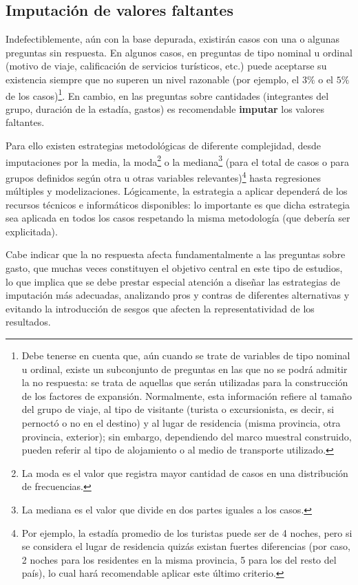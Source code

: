 \documentclass[
]{book}
\begin{document}
\hypertarget{imputaciuxf3n-de-valores-faltantes}{%
\subsection{Imputación de valores faltantes}\label{imputaciuxf3n-de-valores-faltantes}}

Indefectiblemente, aún con la base depurada, existirán casos con una o algunas preguntas sin respuesta. En algunos casos, en preguntas de tipo nominal u ordinal (motivo de viaje, calificación de servicios turísticos, etc.) puede aceptarse su existencia siempre que no superen un nivel razonable (por ejemplo, el \(3\%\) o el \(5\%\) de los casos)\footnote{Debe tenerse en cuenta que, aún cuando se trate de variables de tipo nominal u ordinal, existe un subconjunto de preguntas en las que no se podrá admitir la no respuesta: se trata de aquellas que serán utilizadas para la construcción de los factores de expansión. Normalmente, esta información refiere al tamaño del grupo de viaje, al tipo de visitante (turista o excursionista, es decir, si pernoctó o no en el destino) y al lugar de residencia (misma provincia, otra provincia, exterior); sin embargo, dependiendo del marco muestral construido, pueden referir al tipo de alojamiento o al medio de transporte utilizado.}. En cambio, en las preguntas sobre cantidades (integrantes del grupo, duración de la estadía, gastos) es recomendable \textbf{imputar} los valores faltantes.

Para ello existen estrategias metodológicas de diferente complejidad, desde imputaciones por la media, la moda\footnote{La moda es el valor que registra mayor cantidad de casos en una distribución de frecuencias.} o la mediana\footnote{La mediana es el valor que divide en dos partes iguales a los casos.} (para el total de casos o para grupos definidos según otra u otras variables relevantes)\footnote{Por ejemplo, la estadía promedio de los turistas puede ser de 4 noches, pero si se considera el lugar de residencia quizás existan fuertes diferencias (por caso, 2 noches para los residentes en la misma provincia, 5 para los del resto del país), lo cual hará recomendable aplicar este último criterio.} hasta regresiones múltiples y modelizaciones. Lógicamente, la estrategia a aplicar dependerá de los recursos técnicos e informáticos disponibles: lo importante es que dicha estrategia sea aplicada en todos los casos respetando la misma metodología (que debería ser explicitada).

Cabe indicar que la no respuesta afecta fundamentalmente a las preguntas sobre gasto, que muchas veces constituyen el objetivo central en este tipo de estudios, lo que implica que se debe prestar especial atención a diseñar las estrategias de imputación más adecuadas, analizando pros y contras de diferentes alternativas y evitando la introducción de sesgos que afecten la representatividad de los resultados.
\end{document}
